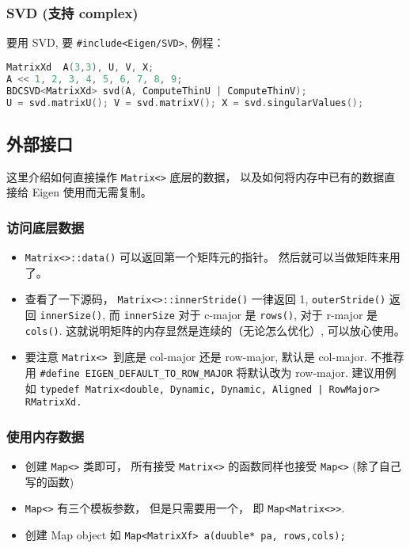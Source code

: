 \subsubsection{SVD (支持 complex)}
要用 SVD, 要 \verb|#include<Eigen/SVD>|, 例程：
\begin{lstlisting}[language=cpp]
MatrixXd  A(3,3), U, V, X;
A << 1, 2, 3, 4, 5, 6, 7, 8, 9;
BDCSVD<MatrixXd> svd(A, ComputeThinU | ComputeThinV);
U = svd.matrixU(); V = svd.matrixV(); X = svd.singularValues();
\end{lstlisting}

\subsection{外部接口}
这里介绍如何直接操作 \verb|Matrix<>| 底层的数据， 以及如何将内存中已有的数据直接给 Eigen 使用而无需复制。

\subsubsection{访问底层数据}
\begin{itemize}
\item \verb|Matrix<>::data()| 可以返回第一个矩阵元的指针。 然后就可以当做矩阵来用了。
\item 查看了一下源码， \verb|Matrix<>::innerStride()| 一律返回 1, \verb|outerStride()| 返回 \verb|innerSize()|, 而 \verb|innerSize| 对于 c-major 是 \verb|rows()|, 对于 r-major 是 \verb|cols()|. 这就说明矩阵的内存显然是连续的（无论怎么优化）, 可以放心使用。
\item 要注意 \verb|Matrix<> |到底是 col-major 还是 row-major, 默认是 col-major. 不推荐用 \verb|#define EIGEN_DEFAULT_TO_ROW_MAJOR| 将默认改为 row-major. 建议用例如 \verb`typedef Matrix<double, Dynamic, Dynamic, Aligned | RowMajor> RMatrixXd.`
\end{itemize}

\subsubsection{使用内存数据}
\begin{itemize}
\item 创建 \verb|Map<>| 类即可， 所有接受 \verb|Matrix<>| 的函数同样也接受 \verb|Map<>| (除了自己写的函数)
\item \verb|Map<>| 有三个模板参数， 但是只需要用一个， 即 \verb|Map<Matrix<>>|.
\item 创建 Map object 如 \verb|Map<MatrixXf> a(duuble* pa, rows,cols);|
\end{itemize}
